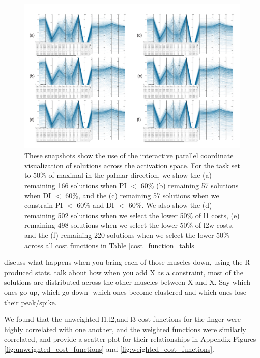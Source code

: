 \begin{figure}[htbp]
\centering
\includegraphics[width=\textwidth]{figs/parcoords.pdf}
\caption{These snapshots show the use of the interactive parallel coordinate visualization of solutions across the activation space. For the task set to 50\% of maximal in the palmar direction, we show the
(a) remaining 166 solutions when PI $<$ 60\% 
(b) remaining 57 solutions when DI $<$ 60\%, and the
(c) remaining 57 solutions when we constrain PI $<$ 60\% and DI $<$ 60\%. We also show the
(d) remaining 502 solutions when we select the lower 50\% of l1 costs,
(e) remaining 498 solutions when we select the lower 50\% of l2w costs, and the
(f) remaining 220 solutions when we select the lower 50\% across all cost functions in Table \ref{cost_function_tabls} }
\label{fig:parcoords}
\end{figure}

discuss what happens when you bring each of those muscles down, using the R produced stats.
talk about how when you add X as a constraint, most of the solutions are distributed across the other muscles between X and X. Say which ones go up, which go down- which ones become clustered and which ones lose their peak/spike.

We found that the unweighted l1,l2,and l3 cost functions for the finger were highly correlated with one another, and the weighted functions were similarly correlated, and provide a scatter plot for their relationships in Appendix Figures \ref{fig:unweighted_cost_functions} and \ref{fig:weighted_cost_functions}.

